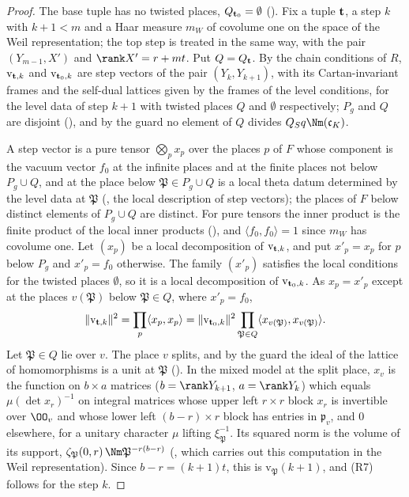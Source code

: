 \begin{proof}
The base tuple has no twisted places, $Q_{\mathbf t_0}=\emptyset$ (). Fix a tuple $\mathbf t$, a step $k$
with $k+1<m$ and a Haar measure $m_W$ of covolume one on the space of the Weil representation; the top step is treated in the same way, with the pair $(Y_{m-1},X')$ and $\rank X'=r+mt$. Put
$Q=Q_\mathbf t$. By the chain conditions of $R$, $\mathrm v_{\mathbf t,k}$ and $\mathrm v_{\mathbf t_0,k}$ are step vectors of the pair $(Y_k,Y_{k+1})$, with
its Cartan-invariant frames and the self-dual lattices given by the frames of the level conditions, for the level data of step $k+1$ with twisted
places $Q$ and $\emptyset$ respectively; $P_g$ and $Q$ are disjoint (), and by the guard no
element of $Q$ divides $Q_Sq\Nm(\mathfrak c_K)$.

A step vector is a pure tensor $\bigotimes_px_p$ over the places $p$ of $F$ whose component is the vacuum vector $f_0$ at the infinite places and at
the finite places not below $P_g\cup Q$, and at the place below $\mathfrak P\in P_g\cup Q$ is a local theta datum determined by the level data at
$\mathfrak P$ (, the local description of step vectors); the places of $F$ below distinct elements
of $P_g\cup Q$ are distinct. For pure tensors the inner product is the finite product of the local inner products
(), and $\langle f_0,f_0\rangle=1$ since $m_W$ has covolume one. Let $(x_p)$ be a
local decomposition of $\mathrm v_{\mathbf t,k}$, and put $x'_p=x_p$ for $p$ below $P_g$ and $x'_p=f_0$ otherwise. The family $(x'_p)$ satisfies the
local conditions for the twisted places $\emptyset$, so it is a local decomposition of $\mathrm v_{\mathbf t_0,k}$. As $x_p=x'_p$ except at the places
$v(\mathfrak P)$ below $\mathfrak P\in Q$, where $x'_p=f_0$,
\[
\|\mathrm v_{\mathbf t,k}\|^2=\prod_p\langle x_p,x_p\rangle=\|\mathrm v_{\mathbf t_0,k}\|^2\prod_{\mathfrak P\in Q}\langle x_{v(\mathfrak P)},
x_{v(\mathfrak P)}\rangle .
\]
Let $\mathfrak P\in Q$ lie over $v$. The place $v$ splits, and by the guard the ideal of the lattice of homomorphisms is a unit at $\mathfrak P$
(). In the mixed model at the split place, $x_v$ is the function on $b\times a$ matrices
($b=\rank Y_{k+1}$, $a=\rank Y_k$) which equals $\mu(\det x_r)^{-1}$ on integral matrices whose upper left $r\times r$ block $x_r$ is invertible over
$\OO_v$ and whose lower left $(b-r)\times r$ block has entries in $\mathfrak p_v$, and $0$ elsewhere, for a unitary character $\mu$ lifting
$\xi_{\mathfrak P}^{-1}$. Its squared norm is the volume of its support, $\zeta_{\mathfrak P}(0,r)\,\Nm\mathfrak P^{-r(b-r)}$
(, which carries out this computation in the Weil representation). Since
$b-r=(k+1)t$, this is $\mathrm v_{\mathfrak P}(k+1)$, and (R7) follows for the step $k$.
\end{proof}

